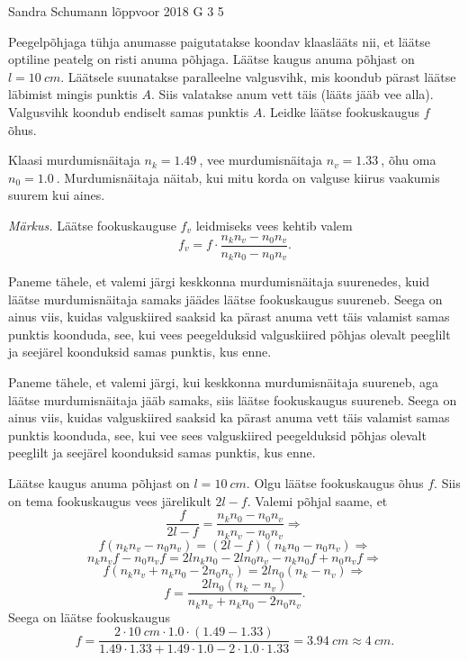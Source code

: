 {Sandra Schumann} %
{lõppvoor} %
{2018} %
{G 3} %
{5} %
{
\ifStatement
Peegelpõhjaga tühja anumasse paigutatakse koondav klaaslääts nii, et läätse optiline peatelg on risti anuma põhjaga. Läätse kaugus anuma põhjast on $l=\SI{10}{cm}$. Läätsele suunatakse paralleelne valgusvihk, mis koondub pärast läätse läbimist mingis punktis $A$. Siis valatakse anum vett täis (lääts jääb vee alla). Valgusvihk koondub endiselt samas punktis $A$. Leidke läätse fookuskaugus $f$ õhus.

Klaasi murdumisnäitaja $n_k = \SI{1,49}{}$, vee murdumisnäitaja $n_v = \SI{1,33}{}$, õhu oma $n_0 = \SI{1,0}{}$. Murdumisnäitaja näitab, kui mitu korda on valguse kiirus vaakumis suurem kui aines.

\emph{Märkus.} Läätse fookuskauguse $f_v$ leidmiseks vees kehtib valem 
\[ f_v = f\cdot\frac{n_k n_v - n_0 n_v}{n_k n_0 - n_0 n_v}. \]
\fi


\ifHint
Paneme tähele, et valemi järgi keskkonna murdumisnäitaja suurenedes, kuid läätse murdumisnäitaja samaks jäädes läätse fookuskaugus suureneb. Seega on ainus viis, kuidas valguskiired saaksid ka pärast anuma vett täis valamist samas punktis koonduda, see, kui vees peegelduksid valguskiired põhjas olevalt peeglilt ja seejärel koonduksid samas punktis, kus enne.
\fi


\ifSolution
Paneme tähele, et valemi järgi, kui keskkonna murdumisnäitaja suureneb, aga läätse murdumisnäitaja jääb samaks, siis läätse fookuskaugus suureneb. Seega on ainus viis, kuidas valguskiired saaksid ka pärast anuma vett täis valamist samas punktis koonduda, see, kui vee sees valguskiired peegelduksid põhjas olevalt peeglilt ja seejärel koonduksid samas punktis, kus enne.

Läätse kaugus anuma põhjast on $l = \SI{10}{cm}$. Olgu läätse fookuskaugus õhus $f$. Siis on tema fookuskaugus vees järelikult $2l-f$. Valemi põhjal saame, et
\[ \frac{f}{2l-f} = \frac{n_k n_0 - n_0 n_v}{n_k n_v - n_0 n_v}\Rightarrow \]
\[ f(n_k n_v - n_0 n_v) = (2l-f)(n_k n_0 - n_0 n_v)\Rightarrow \]
\[ n_k n_v f - n_0 n_v f = 2l n_k n_0 - 2l n_0 n_v - n_k n_0 f + n_0 n_v f\Rightarrow \]
\[ f (n_k n_v + n_k n_0 - 2 n_0 n_v) = 2l n_0 (n_k - n_v)\Rightarrow \]
\[ f = \frac{2l n_0 (n_k - n_v)}{n_k n_v + n_k n_0 - 2 n_0 n_v}. \]
Seega on läätse fookuskaugus 
\[ f = \frac{\num{2} \cdot \SI{10}{cm} \cdot \num{1,0} \cdot (\num{1,49} - \num{1,33})}{\num{1,49}
\cdot \num{1,33} + \num{1,49} \cdot \num{1,0} - \num{2} \cdot \num{1,0} \cdot \num{1,33}} = \SI{3,94}{cm}
\approx \SI{4}{cm}. \]
\fi


}
